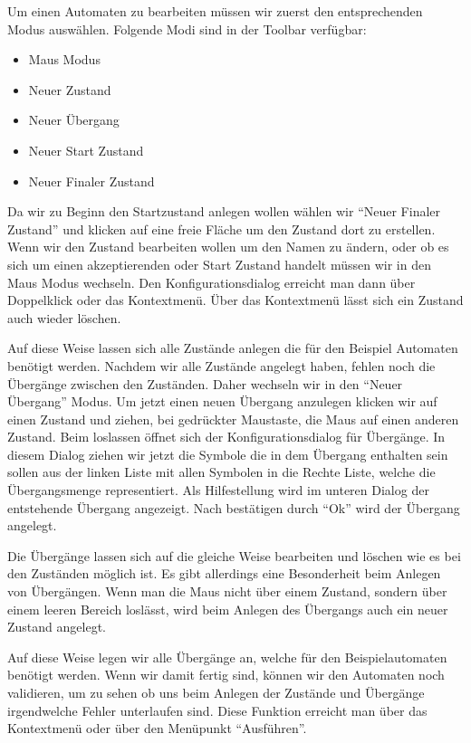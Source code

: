Um einen Automaten zu bearbeiten müssen wir zuerst den entsprechenden Modus
auswählen. Folgende Modi sind in der Toolbar verfügbar:

\begin{itemize}
  \item Maus Modus
  \item Neuer Zustand
  \item Neuer Übergang
  \item Neuer Start Zustand
  \item Neuer Finaler Zustand
\end{itemize}

Da wir zu Beginn den Startzustand anlegen wollen wählen wir "`Neuer Finaler
Zustand"' und klicken auf eine freie Fläche um den Zustand dort zu erstellen.
Wenn wir den Zustand bearbeiten wollen um den Namen zu ändern, oder ob es sich
um einen akzeptierenden oder Start Zustand handelt müssen wir in den Maus Modus
wechseln. Den Konfigurationsdialog erreicht man dann über Doppelklick oder das
Kontextmenü. Über das Kontextmenü lässt sich ein Zustand auch wieder
löschen.\vspace{10pt}

Auf diese Weise lassen sich alle Zustände anlegen die für den Beispiel
Automaten benötigt werden. Nachdem wir alle Zustände angelegt haben, fehlen
noch die Übergänge zwischen den Zuständen. Daher wechseln wir in den "`Neuer
Übergang"' Modus. Um jetzt einen neuen Übergang anzulegen klicken wir auf einen
Zustand und ziehen, bei gedrückter Maustaste, die Maus auf einen anderen
Zustand. Beim loslassen öffnet sich der Konfigurationsdialog für Übergänge. In
diesem Dialog ziehen wir jetzt die Symbole die in dem Übergang enthalten
sein sollen aus der linken Liste mit allen Symbolen in die Rechte Liste, welche
die Übergangsmenge representiert. Als Hilfestellung wird im unteren Dialog der
entstehende Übergang angezeigt. Nach bestätigen durch "`Ok"' wird der
Übergang angelegt.\vspace{10pt}

Die Übergänge lassen sich auf die gleiche Weise bearbeiten und löschen wie
es bei den Zuständen möglich ist. Es gibt allerdings eine Besonderheit beim
Anlegen von Übergängen. Wenn man die Maus nicht über einem Zustand, sondern
über einem leeren Bereich loslässt, wird beim Anlegen des Übergangs auch ein
neuer Zustand angelegt.\vspace{10pt}

Auf diese Weise legen wir alle Übergänge an, welche für den Beispielautomaten
benötigt werden. Wenn wir damit fertig sind, können wir den Automaten noch
validieren, um zu sehen ob uns beim Anlegen der Zustände und Übergänge
irgendwelche Fehler unterlaufen sind. Diese Funktion
erreicht man über das Kontextmenü oder über den Menüpunkt "`Ausführen"'.

